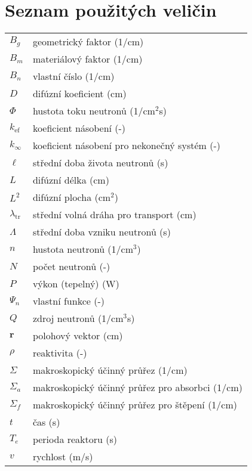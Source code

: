 \section*{Seznam použitých veličin}

\renewcommand{\arraystretch}{1.2}
\begin{table}[H]
\begin{tabular}{p{1cm}l}
  $B_g$           & geometrický faktor (1/cm) \\
  $B_m$           & materiálový faktor (1/cm) \\
  $B_n$           & vlastní číslo (1/cm) \\
  $D$             & difúzní koeficient (cm) \\
  $\Phi$          & hustota toku neutronů (1/cm$^2$s) \\
  $k_{\text{ef}}$ & koeficient násobení (-) \\
  $k_{\infty}$    & koeficient násobení pro nekonečný systém (-) \\
  $\ell$          & střední doba života neutronů (s) \\
  $L$             & difúzní délka (cm) \\
  $L^2$           & difúzní plocha (cm$^2$) \\
  $\lambda_\text{tr}$ & střední volná dráha pro transport (cm) \\
  $\Lambda$       & střední doba vzniku neutronů (s) \\
  $n$             & hustota neutronů (1/cm$^3$) \\
  $N$             & počet neutronů (-) \\
  $P$             & výkon (tepelný) (W) \\
  $\Psi_n$        & vlastní funkce (-) \\
  $Q$             & zdroj neutronů (1/cm$^3$s) \\
  $\textbf{r}$    & polohový vektor (cm) \\
  $\rho$          & reaktivita (-) \\
  $\Sigma$        & makroskopický účinný průřez (1/cm) \\
  $\Sigma_a$      & makroskopický účinný průřez pro absorbci (1/cm) \\
  $\Sigma_f$      & makroskopický účinný průřez pro štěpení (1/cm) \\
  $t$             & čas (s) \\
  $T_e$           & perioda reaktoru (s) \\
  $v$             & rychlost (m/s) \\

\end{tabular}
\end{table}
\renewcommand{\arraystretch}{1}
